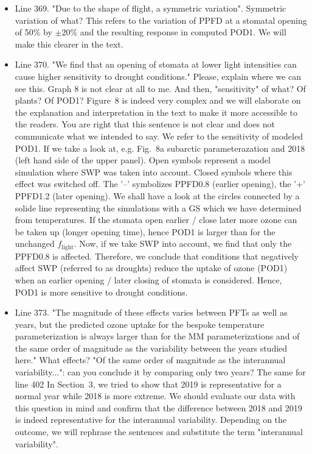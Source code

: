 \documentclass{scrartcl}
\begin{document}
\begin{itemize}
\item {\color{blue}Line 369. "Due to the shape of flight, a symmetric variation".
Symmetric variation of what?}
This refers to the variation of PPFD at a stomatal opening of 50\% by $\pm 20\%$ and the resulting response in computed POD1. We will make this clearer in the text.

\item {\color{blue}Line 370. "We find that an opening of stomata at lower light intensities can cause higher sensitivity to drought conditions." Please, explain where we can see this. Graph 8 is not clear at all to me. And then, "sensitivity" of what? Of plants? Of POD1?}
Figure~8 is indeed very complex and we will elaborate on the explanation and interpretation in the text to make it more accessible to the readers. You are right that this sentence is not clear and does not communicate what we intended to say. We refer to the sensitivity of modeled POD1. If we take a look at, e.g. Fig.~8a subarctic parameterazation and 2018 (left hand side of the upper panel). Open symbols represent a model simulation where SWP was taken into account. Closed symbols where this effect was switched off. The '--' symbolizes PPFD0.8 (earlier opening), the '+' PPFD1.2 (later opening). We shall have a look at the circles connected by a solide line representing the simulations with a GS which we have determined from temperatures. If the stomata open earlier / close later more ozone can be taken up (longer opening time), hence POD1 is larger than for the unchanged $f_\mathrm{light}$. Now, if we take SWP into account, we find that only the PPFD0.8 is affected. Therefore, we conclude that conditions that negatively affect SWP (referred to as droughts) reduce the uptake of ozone (POD1) when an earlier opening / later closing of stomata is considered. Hence, POD1 is more sensitive to drought conditions.

\item {\color{blue}Line 373. "The magnitude of these effects varies between PFTs as well as years, but the predicted ozone uptake for the bespoke temperature parameterization is always larger than for the MM parameterizations and of the same order of magnitude as the variability between the years studied here."
What effects? "Of the same order of magnitude as the interannual variability...": can you conclude it by comparing only two years? The same for line 402}
In Section~3, we tried to show that 2019 is representative for a normal year while 2018 is more extreme. We should evaluate our data with this question in mind and confirm that the difference between 2018 and 2019 is indeed representative for the interannual variability. Depending on the outcome, we will rephrase the sentences and substitute the term "interannual variability".


\end{itemize}
\end{document}
